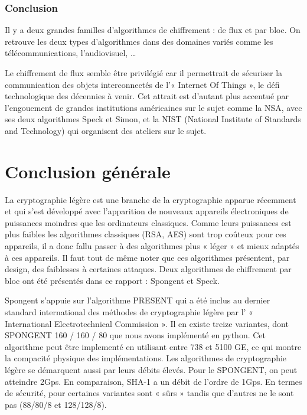 	\section{Conclusion}

	 Il y a deux grandes familles d'algorithmes de chiffrement : de flux et par
	bloc. On retrouve les deux types d'algorithmes dans des domaines variés comme
	les télécommunications, l'audiovisuel, \dots

	Le chiffrement de flux semble être privilégié car il permettrait de sécuriser
	la communication des objets interconnectés de l'« Internet Of Things », le
	défi technologique des décennies à venir. Cet attrait est d'autant plus
	accentué par l'engouement de grandes institutions américaines sur le sujet
	comme la NSA, avec ses deux algorithmes Speck et Simon, et la NIST (National
	Institute of Standards and Technology) qui organisent des ateliers sur le
	sujet.

\newpage
\part*{Conclusion générale}

	La cryptographie légère est une branche de la cryptographie apparue récemment
	et qui s'est développé avec l'apparition de nouveaux appareils électroniques de
	puissances moindres que les ordinateurs classiques. Comme leurs puissances est
	plus faibles les algorithmes classiques (RSA, AES) sont trop coûteux pour ces
	appareils, il a donc fallu passer à des algorithmes plus « léger » et mieux
	adaptés à ces appareils. Il faut tout de même noter que ces algorithmes
	présentent, par design, des faiblesses à certaines attaques. Deux algorithmes de
	chiffrement par bloc ont été présentés dans ce rapport : Spongent et Speck.

	Spongent s'appuie sur l'algorithme PRESENT qui a été inclus au dernier standard
	international des méthodes de cryptographie légère par l’ « International
	Electrotechnical Commission ». Il en existe treize variantes, dont SPONGENT 160 /
	160 / 80 que nous avons implémenté en python. Cet algorithme peut être
	implementé en utilisant entre 738 et 5100 GE, ce qui montre la compacité
	physique des implémentations. Les algorithmes de cryptographie légère se
	démarquent aussi par leurs débits élevés. Pour le SPONGENT, on peut atteindre
	2Gps. En comparaison, SHA-1 a un débit de l'ordre de 1Gps. En termes de
	sécurité, pour certaines variantes sont « sûrs » tandis que d'autres ne le sont
	pas (88/80/8 et 128/128/8).

